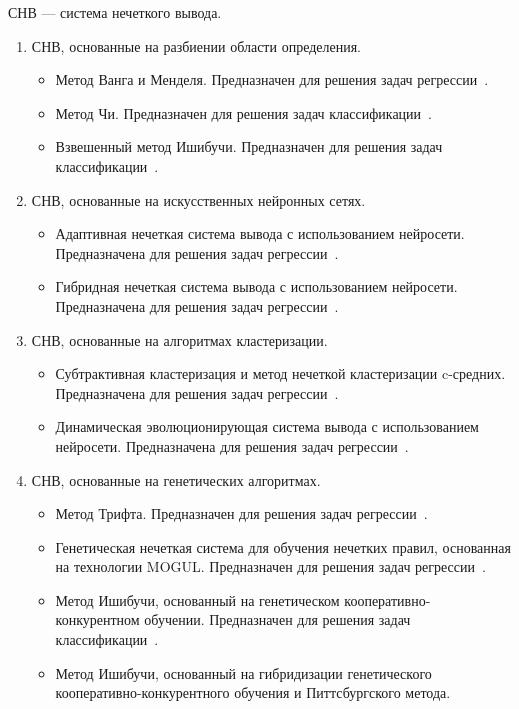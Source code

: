 СНВ --- система нечеткого вывода.
\begin{enumerate}
\item СНВ, основанные на разбиении области определения.
\begin{itemize}
\item Метод Ванга и Менделя. Предназначен для решения задач регрессии~\cite{Wang1992}.
\item Метод Чи. Предназначен для решения задач классификации~\cite{Chi1996}.
\item Взвешенный метод Ишибучи. Предназначен для решения задач классификации~\cite{Ishibuchi2001}.
\end{itemize}
\item СНВ, основанные на искусственных нейронных сетях.
\begin{itemize}
	\item Адаптивная нечеткая система вывода с использованием нейросети. Предназначена для решения задач регрессии~\cite{Jan1993}. 
	\item Гибридная нечеткая система вывода с использованием нейросети.  Предназначена для решения задач регрессии~\cite{Kim1999}.
\end{itemize}
\item СНВ, основанные на алгоритмах кластеризации.
\begin{itemize}
	\item Субтрактивная кластеризация и метод нечеткой кластеризации c-средних.
	Предназначена для решения задач регрессии~\cite{Chiu1996}.
	\item Динамическая эволюционирующая система вывода с использованием нейросети. Предназначена для решения задач регрессии~\cite{Kasabov2002}.
\end{itemize}	
\item СНВ, основанные на генетических алгоритмах.
\begin{itemize}
	\item Метод Трифта. Предназначен для решения задач регрессии~\cite{Thrift1991}.
	\item Генетическая нечеткая система для обучения нечетких правил, основанная на технологии MOGUL. Предназначен для решения задач регрессии~\cite{Cordon1999}.
	\item Метод Ишибучи, основанный на генетическом кооперативно-кон\-курентном обучении. Предназначен для решения задач классификации~\cite{Ishibuchi1999}.
	\item Метод Ишибучи, основанный на гибридизации генетического ко\-оперативно-конкурентного обучения и Питтсбургского метода. 

\end{itemize}
\end{enumerate}
